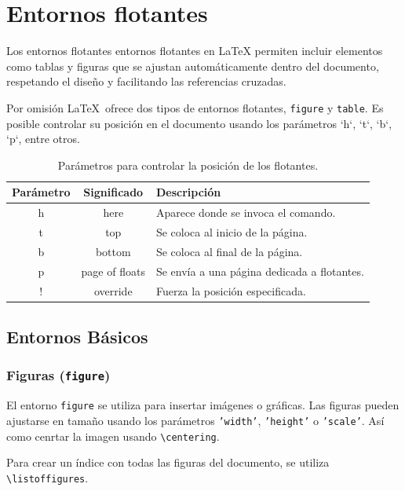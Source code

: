 \documentclass{book}
\begin{document}
\chapter*{Entornos flotantes}\label{ch:entornos flotantes}
Los entornos flotantes entornos flotantes en LaTeX permiten incluir elementos como tablas y figuras que se ajustan automáticamente dentro del documento, respetando el diseño y facilitando las referencias cruzadas.

Por omisión \LaTeX\ ofrece dos tipos de entornos flotantes, \texttt{figure} y \texttt{table}. Es posible controlar su posición en el documento usando los parámetros `h`, `t`, `b`, `p`, entre otros.

\begin{table}[h!]
    \centering
    \begin{tabular}{c|c|l}
         \hline
         Parámetro & Significado & Descripción \\ \hline
         h & here & Aparece donde se invoca el comando. \\ \hline
         t & top & Se coloca al inicio de la página. \\ \hline
         b & bottom & Se coloca al final de la página. \\ \hline
         p & page of floats & Se envía a una página dedicada a flotantes. \\ \hline
         ! & override & Fuerza la posición especificada. \\ \hline
    \end{tabular}
    \caption{Parámetros para controlar la posición de los flotantes.}
    \label{tabla:parametros_posicion}
\end{table}

\section{Entornos Básicos}
\subsection{Figuras (\texttt{figure})}
El entorno \texttt{figure} se utiliza para insertar imágenes o gráficas. Las figuras pueden ajustarse en tamaño usando los parámetros \texttt{'width'}, \texttt{'height'} o \texttt{'scale'}. Así como cenrtar la imagen usando \verb|\centering|.

Para crear un índice con todas las figuras del documento, se utiliza \verb|\listoffigures|.\\
\end{document}
